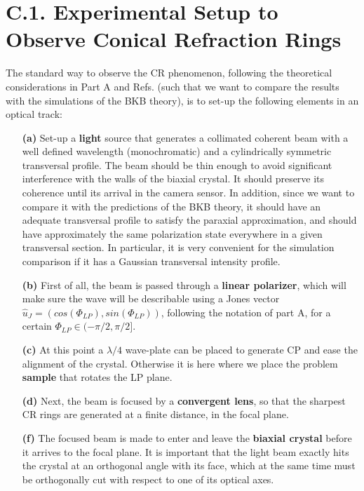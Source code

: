 \documentclass[11pt, a4paper, twoside]{article} %
\begin{document}
\section*{C.1. Experimental Setup to Observe Conical Refraction Rings}\vspace{-0.2cm}
The standard way to observe the CR phenomenon, following the theoretical considerations in Part A and Refs. \cite{Todor, Turpin} (such that we want to compare the results with the simulations of the BKB theory), is to set-up the following elements in an optical track:\vspace{-0.2cm} 
\begin{itemize}
\item[\bf (a)] Set-up a {\bf light} source that generates a collimated coherent beam with a well defined wavelength (monochromatic) and a cylindrically symmetric transversal profile. The beam should be thin enough to avoid significant interference with the walls of the biaxial crystal. It should preserve its coherence until its arrival in the camera sensor. In addition, since we want to compare it with the predictions of the BKB theory, it should have an adequate transversal profile to satisfy the paraxial approximation, and should have approximately the same polarization state everywhere in a given transversal section. In particular, it is very convenient for the simulation comparison if it has a Gaussian transversal intensity profile.

\item[\bf (b)] First of all, the beam is passed through a {\bf linear polarizer}, which will make sure the wave will be describable using a Jones vector $\hat{u}_J=(cos(\Phi_{LP}), sin(\Phi_{LP}))$, following the notation of part A, for a certain $\Phi_{LP}\in(-\pi/2, \pi/2]$.

\item[\bf (c)] At this point a $\lambda/4$ wave-plate can be placed to generate CP and ease the alignment of the crystal. Otherwise it is here where we place the problem {\bf sample} that rotates the LP plane. 

\item[\bf (d)] Next, the beam is focused by a {\bf convergent lens}, so that the sharpest CR rings are generated at a finite distance, in the focal plane.

\item[\bf (f)] The focused beam is made to enter and leave the {\bf biaxial crystal} before it arrives to the focal plane. It is important that the light beam exactly hits the crystal at an orthogonal angle with its face, which at the same time must be orthogonally cut with respect to one of its optical axes. 


\end{itemize}
\end{document}
